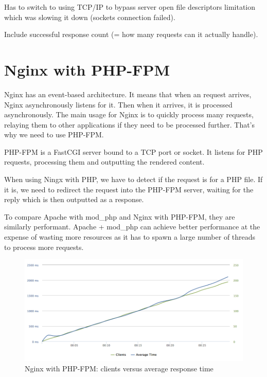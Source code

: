 Has to switch to using TCP/IP to bypass server open file descriptors limitation which was slowing it down (sockets connection failed).

Include successful response count (= how many requests can it actually handle).

\section{Nginx with PHP-FPM}

Nginx has an event-based architecture. It means that when an request arrives, Nginx asynchronously listens for it. Then when it arrives, it is processed asynchronously. The main usage for Nginx is to quickly process many requests, relaying them to other applications if they need to be processed further. That's why we need to use PHP-FPM.

PHP-FPM is a FastCGI server bound to a TCP port or socket. It listens for PHP requests, processing them and outputting the rendered content.

When using Ningx with PHP, we have to detect if the request is for a PHP file. If it is, we need to redirect the request into the PHP-FPM server, waiting for the reply which is then outputted as a response.


To compare Apache with mod\_php and Nginx with PHP-FPM, they are similarly performant. Apache + mod\_php can achieve better performance at the expense of wasting more resources as it has to spawn a large number of threads to process more requests. 

\begin{figure}[H]
\begin{center}
\includegraphics[scale=0.5]{figures/Nginx_PHP-FPM.png}
\caption{Nginx with PHP-FPM: clients versus average response time}
\label{fig:nginx_php-fpm}
\end{center}
\end{figure}

